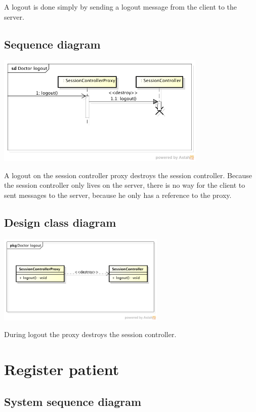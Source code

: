 \documentclass[fontsize=12pt,
               paper=a4,
               twoside=false,
               parskip=half,
               ]{scrartcl}
\begin{document}
A logout is done simply by sending a logout message from the client to the server.

\subsection{Sequence diagram}

\includegraphics[width=10cm]{./img/sequence-diagrams/doctor-logout.png}

A logout on the session controller proxy destroys the session controller. Because the session controller only lives on the server, there is no way for the client to sent messages to the server, because he only has a reference to the proxy.

\subsection{Design class diagram}

\includegraphics[width=8cm]{./img/design-class-diagrams/doctor-logout.png}

During logout the proxy destroys the session controller.

\section{Register patient}

\subsection{System sequence diagram}
\end{document}
